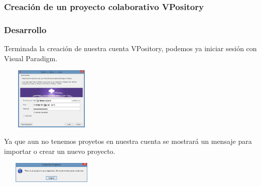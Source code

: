 \documentclass[8pt]{beamer}
\begin{document}
\subsubsection{Creación de un proyecto colaborativo VPository}
\begin{frame}
\frametitle{Desarrollo}

\setlength{\parskip}{05pt}
Terminada la creación de nuestra cuenta VPository, podemos ya iniciar sesión con Visual Paradigm.
\begin{center}

\setlength{\parskip}{06pt}
\includegraphics[width=5cm, height=3cm]{img/cap8}
\end{center}

Ya que aun no tenemos proyetos en nuestra cuenta se mostrará un mensaje para importar o crear un  nuevo proyecto.
\begin{center}
\setlength{\parskip}{08pt}
\includegraphics[width=5cm, height=1cm]{img/cap9}
\end{center}
\end{frame}
\end{document}
